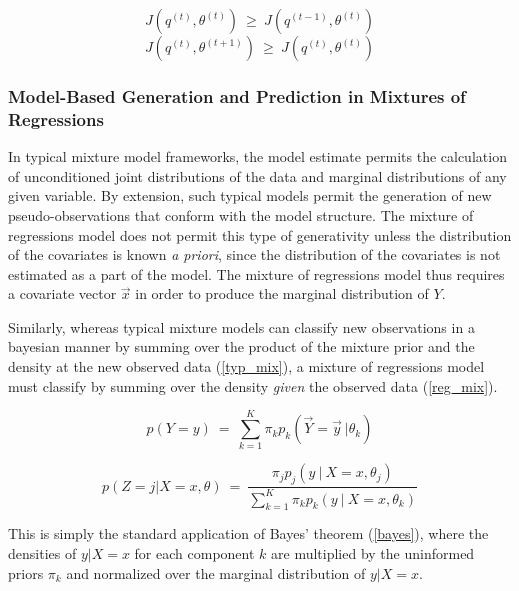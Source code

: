 \documentclass[10pt]{olplainarticle}\usepackage[]{graphicx}\usepackage[]{color}
\begin{document}
\begin{equation} \label{eineq}
   J(q^{(t)}, \theta^{(t)}) \ \geq \ J(q^{(t-1)}, \theta^{(t)})
\end{equation}
\begin{equation} \label{mineq}
   J(q^{(t)}, \theta^{(t+1)}) \ \geq \ J(q^{(t)}, \theta^{(t)})
\end{equation}




\subsubsection{Model-Based Generation and Prediction in Mixtures of Regressions} \label{prediction}

In typical mixture model frameworks, the model estimate permits the calculation of unconditioned joint distributions of the data and marginal distributions of any given variable. By extension, such typical models permit the generation of new pseudo-observations that conform with the model structure. The mixture of regressions model does not permit this type of generativity unless the distribution of the covariates is known \emph{a priori}, since the distribution of the covariates is not estimated as a part of the model. The mixture of regressions model thus requires a covariate vector $\vec{x}$ in order to produce the marginal distribution of $Y$.

Similarly, whereas typical mixture models can classify new observations in a bayesian manner by summing over the product of the mixture prior and the density at the new observed data (\ref{typ_mix}), a mixture of regressions model must classify by summing over the density \emph{given} the observed data (\ref{reg_mix}).

\begin{equation} \label{typ_mix}
  p(Y = y) \ =\ \sum_{k=1}^{K}\pi_k p_k(\vec{Y} = \vec{y}\ | \theta_k)
\end{equation}

\begin{equation} \label{reg_mix}
  p(Z = j | X = x, \theta) \ =\ \frac{\pi_j p_j(y \ | \ X = x, \theta_j)}{\sum_{k=1}^{K}\pi_k p_k(y \ | \ X = x, \theta_k)}
\end{equation}

This is simply the standard application of Bayes' theorem (\ref{bayes}), where the densities of $y | X = x$ for each component $k$ are multiplied by the uninformed priors $\pi_k$ and normalized over the marginal distribution of $y | X = x$.
\end{document}
